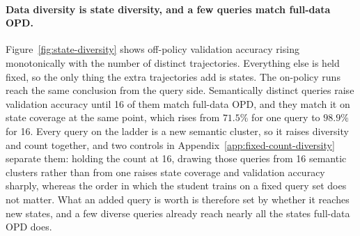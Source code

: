 \paragraph{Data diversity is state diversity, and a few queries match full-data OPD.}
Figure~\ref{fig:state-diversity} shows off-policy validation accuracy rising monotonically with the number of distinct trajectories. Everything else is held fixed, so the only thing the extra trajectories add is states. The on-policy runs reach the same conclusion from the query side. Semantically distinct queries raise validation accuracy until 16 of them match full-data OPD, and they match it on state coverage at the same point, which rises from \(71.5\%\) for one query to \(98.9\%\) for 16. Every query on the ladder is a new semantic cluster, so it raises diversity and count together, and two controls in Appendix~\ref{app:fixed-count-diversity} separate them: holding the count at 16, drawing those queries from 16 semantic clusters rather than from one raises state coverage and validation accuracy sharply, whereas the order in which the student trains on a fixed query set does not matter. What an added query is worth is therefore set by whether it reaches new states, and a few diverse queries already reach nearly all the states full-data OPD does.